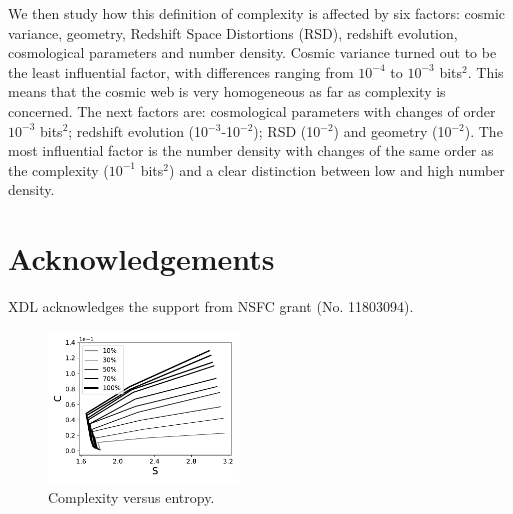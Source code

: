 \documentclass[fleqn,usenatbib]{mnras}
\begin{document}
We then study how this definition of complexity is affected by six
factors: cosmic variance, geometry, Redshift Space Distortions (RSD),
redshift evolution, cosmological parameters and number density. Cosmic
variance turned out to be the least influential factor, with
differences ranging from $10^{-4}$ to $10^{-3}$ bits$^2$. This means
that the cosmic web is very homogeneous as far as complexity is
concerned. The next factors are: cosmological parameters with changes
of order $10^{-3}$ bits$^2$; redshift evolution (10$^{-3}$-10$^{-2}$);
RSD (10$^{-2}$) and geometry (10$^{-2}$). The most influential factor
is the number density with changes of the same order as the complexity
($10^{-1}$ bits$^2$) and a clear distinction between low and high
number density.  

\section*{Acknowledgements}
XDL acknowledges the support from NSFC grant (No. 11803094).





\begin{figure}
    \centering
    \includegraphics[width=0.45\textwidth]{cvs_porc.pdf}
    \caption{Complexity versus entropy.}
    \label{fig:cvs}
\end{figure}
\end{document}
